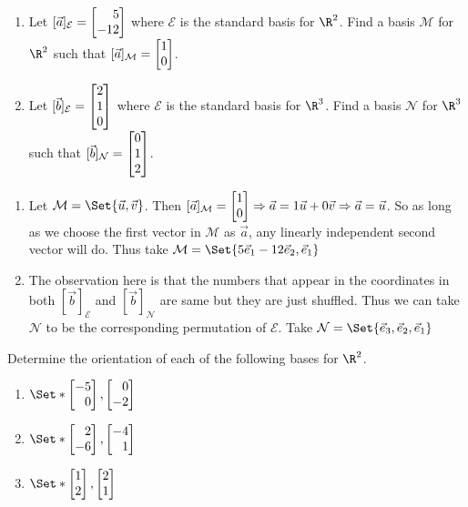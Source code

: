 \begin{exercises}
\begin{problist}
		\prob
		\begin{enumerate}
			\item Let $[\vec a]_{\mathcal E}=\mat{5\\-12}$ where $\mathcal
				E$ is the standard basis for $\R^{2}$. Find a
				basis $\mathcal M$ for $\R^{2}$ such that
				$[\vec a]_{\mathcal M}=\mat{1\\0}$.

			\item Let $[\vec b]_{\mathcal E}=\mat{2\\1\\0}$ where $\mathcal
				E$ is the standard basis for $\R^{3}$. Find a
				basis $\mathcal N$ for $\R^{3}$ such that
				$[\vec b]_{\mathcal N}=\mat{0\\1\\2}$.
		\end{enumerate}
		\begin{solution}
			\begin{enumerate}
				\item Let $\mathcal{M} = \Set{ \vec{u}, \vec{v}}$. 
					Then $[\vec{a}]_{\mathcal{M}} = \mat{1\\0} \Rightarrow \vec{a} = 1 \vec{u} + 0 
					\vec{v} \Rightarrow \vec{a} = \vec{u}$. So as long as we choose the first vector in $\mathcal{M}$ as $\vec{a}$, any 
					linearly independent second vector will do. Thus take $\mathcal{M} = \Set{5\xhat - 12 \yhat , \xhat }$
				\item The observation here is that the numbers that appear in the coordinates in both $[\vec{b}]_{\mathcal{E}}$ and 
					$[\vec{b}]_{\mathcal{N}}$ are same but they are just shuffled. Thus we can take $\mathcal{N}$ to be the corresponding 
					permutation of  $\mathcal{E}$. Take $\mathcal{N} = \Set{ \zhat, \yhat, \xhat}$
			\end{enumerate}
		\end{solution}

		\prob Determine the orientation of each of the following bases
		for $\R^{2}$.
		\begin{enumerate}
			\item $\Set*{\mat{-5\\0},\mat{0\\-2}}$

			\item $\Set*{\mat{2\\-6},\mat{-4\\1}}$

			\item $\Set*{\mat{1\\2},\mat{2\\1}}$


\end{enumerate}
\end{problist}
\end{exercises}
